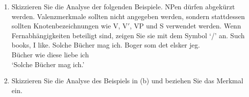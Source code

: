 {\begin{enumerate}
\eal
\ex
\gll Arbejder Bjarne ihærdigt  på bogen?\\
     arbeitet Bjarne ernsthaft an Buch.\textsc{def}\\\danish
\glt `Arbeitet Bjarne ernsthaft an dem Buch?'
\ex
 Arbeitet Bjarne ernsthaft an dem Buch?
\zl

\item Skizzieren Sie die Analyse der folgenden Beispiele. NPen dürfen abgekürzt werden. Valenzmerkmale sollten
  nicht angegeben werden, sondern stattdessen sollten Knotenbezeichnungen wie V, V$'$, VP und S verwendet werden. Wenn Fern\-abhängigkeiten
  beteiligt sind, zeigen Sie sie mit dem Symbol `/' an.
\eal
\ex Such books, I like.
\ex 
 Solche Bücher mag ich.
\ex
\gll Boger som det elsker jeg.\\
     Bücher wie diese liebe ich\\\danish
\glt `Solche Bücher mag ich.'
\zl

\item Skizzieren Sie die Analyse des Beispiels in (b) und beziehen Sie das Merkmal \comps ein.

\end{enumerate}

}


